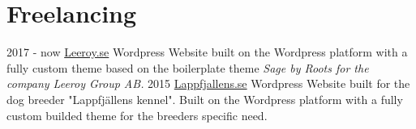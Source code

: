 \section{Freelancing}

\begin{entrylist}
    \entry
        {2017 - now}
        {\href{https://leeroy.se}{Leeroy.se}}
        {Wordpress}
        {Website built on the Wordpress platform with a fully custom theme based on the boilerplate theme \it{Sage} by Roots for the company Leeroy Group AB.}
    \entry
        {2015}
        {\href{http://lappfjallens.se}{Lappfjallens.se}}
        {Wordpress}
        {Website built for the dog breeder "Lappfjällens kennel". Built on the Wordpress platform with a fully custom builded theme for the breeders specific need.}
\end{entrylist}
